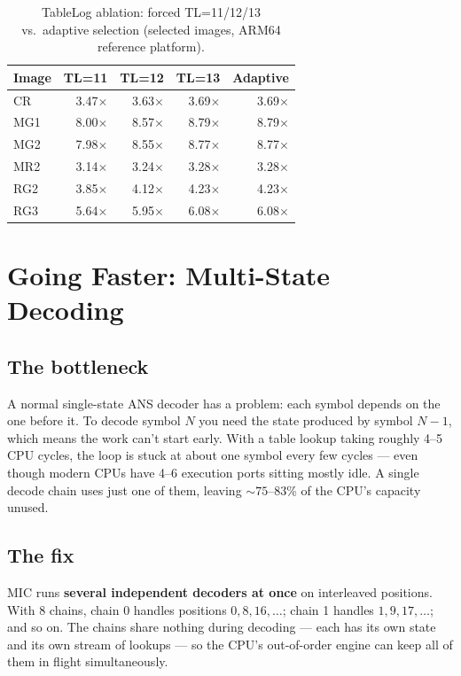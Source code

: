 \documentclass[11pt]{article}
\begin{document}
\begin{table}[htbp]
\centering
\caption{TableLog ablation: forced TL=11/12/13 vs.\ adaptive selection
(selected images, ARM64 reference platform).}
\label{tab:tablelog-ablation}
\begin{tabular}{lrrrr}
\toprule
Image & TL=11 & TL=12 & TL=13 & Adaptive \\
\midrule
CR  & 3.47$\times$ & 3.63$\times$ & 3.69$\times$ & 3.69$\times$ \\
MG1 & 8.00$\times$ & 8.57$\times$ & 8.79$\times$ & 8.79$\times$ \\
MG2 & 7.98$\times$ & 8.55$\times$ & 8.77$\times$ & 8.77$\times$ \\
MR2 & 3.14$\times$ & 3.24$\times$ & 3.28$\times$ & 3.28$\times$ \\
RG2 & 3.85$\times$ & 4.12$\times$ & 4.23$\times$ & 4.23$\times$ \\
RG3 & 5.64$\times$ & 5.95$\times$ & 6.08$\times$ & 6.08$\times$ \\
\bottomrule
\end{tabular}
\end{table}

\section{Going Faster: Multi-State Decoding}

\subsection{The bottleneck}

A normal single-state ANS decoder has a problem: each symbol depends on the
one before it. To decode symbol $N$ you need the state produced by symbol
$N-1$, which means the work can't start early. With a table lookup taking
roughly 4--5 CPU cycles, the loop is stuck at about one symbol every few
cycles --- even though modern CPUs have 4--6 execution ports sitting mostly
idle. A single decode chain uses just one of them, leaving ${\sim}75$--83\% of
the CPU's capacity unused.

\subsection{The fix}

MIC runs \textbf{several independent decoders at once} on interleaved
positions. With 8 chains, chain 0 handles positions $0, 8, 16, \ldots$; chain 1
handles $1, 9, 17, \ldots$; and so on. The chains share nothing during decoding
--- each has its own state and its own stream of lookups --- so the CPU's
out-of-order engine can keep all of them in flight simultaneously.
\end{document}
